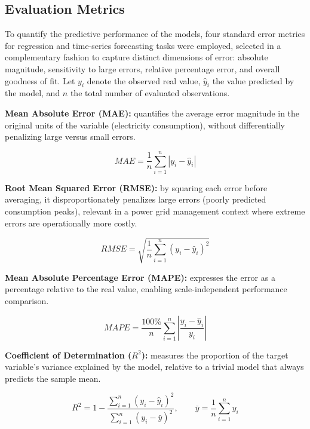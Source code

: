 \documentclass{ieeeaccess}
\begin{document}
\subsection{Evaluation Metrics}
To quantify the predictive performance of the models, four standard error metrics for regression and time-series forecasting tasks were employed, selected in a complementary fashion to capture distinct dimensions of error: absolute magnitude, sensitivity to large errors, relative percentage error, and overall goodness of fit. Let $y_i$ denote the observed real value, $\hat{y}_i$ the value predicted by the model, and $n$ the total number of evaluated observations.

\textbf{Mean Absolute Error (MAE):} quantifies the average error magnitude in the original units of the variable (electricity consumption), without differentially penalizing large versus small errors.

\begin{equation}
MAE = \frac{1}{n}\sum_{i=1}^{n} |y_i - \hat{y}_i|
\end{equation}

\textbf{Root Mean Squared Error (RMSE):} by squaring each error before averaging, it disproportionately penalizes large errors (poorly predicted consumption peaks), relevant in a power grid management context where extreme errors are operationally more costly.

\begin{equation}
RMSE = \sqrt{\frac{1}{n}\sum_{i=1}^{n} (y_i - \hat{y}_i)^2}
\end{equation}

\textbf{Mean Absolute Percentage Error (MAPE):} expresses the error as a percentage relative to the real value, enabling scale-independent performance comparison.

\begin{equation}
MAPE = \frac{100\%}{n}\sum_{i=1}^{n} \left| \frac{y_i - \hat{y}_i}{y_i} \right|
\end{equation}

\textbf{Coefficient of Determination ($R^2$):} measures the proportion of the target variable's variance explained by the model, relative to a trivial model that always predicts the sample mean.

\begin{equation}
R^{2} = 1 - \frac{\sum_{i=1}^{n}(y_i - \hat{y}_i)^2}{\sum_{i=1}^{n}(y_i - \bar{y})^2}, \qquad \bar{y} = \frac{1}{n}\sum_{i=1}^{n} y_i
\end{equation}
\end{document}

